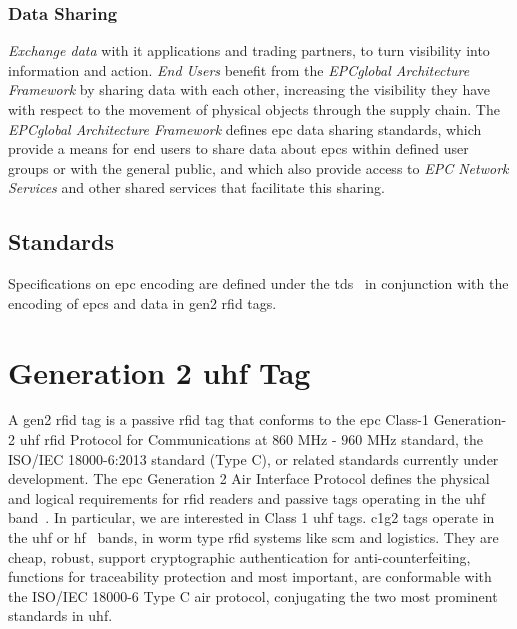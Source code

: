 \subsubsection{Data Sharing} 

\emph{Exchange data} with \ac{it} applications and trading partners, to turn visibility into information and action.
\emph{End Users} benefit from the \emph{EPCglobal Architecture Framework} by sharing data with each other, increasing the visibility they have with respect to the movement of physical objects through the supply chain. 
The \emph{EPCglobal Architecture Framework} defines \ac{epc} data sharing standards, which provide a means for end users to share data about \acp{epc} within defined user groups or with the general public, and which also provide access to \emph{EPC Network Services} and other shared services that facilitate this sharing.



\subsection{Standards}


Specifications on \ac{epc} encoding are defined under the \ac{tds}~\cite{GS1EPCTDS} in conjunction with the encoding of \acp{epc} and data in \ac{gen2} \ac{rfid} tags.

\section{Generation 2 \ac{uhf} Tag}

A \ac{gen2} \ac{rfid} tag is a passive \ac{rfid} tag that conforms to the \ac{epc} Class-1 Generation-2 \ac{uhf} \ac{rfid} Protocol for Communications at $860$ MHz - $960$ MHz standard, the ISO/IEC 18000-6:2013 standard (Type C), or related standards currently under development.
The \ac{epc} Generation 2 Air Interface Protocol defines the physical and logical requirements for \ac{rfid} readers and passive tags operating in the \ac{uhf} band~\cite{Gs1epcgen2v2uhfairinterfaceI2120180904}.
In particular, we are interested in Class 1 \ac{uhf} tags. \ac{c1g2} tags operate in the \ac{uhf} or \ac{hf}~\cite{EpcglobalHf3standard20110905r3} bands, in \ac{worm} type \ac{rfid} systems like \ac{scm} and logistics.
They are cheap, robust, support cryptographic authentication for anti-counterfeiting, functions for traceability protection and most important, are conformable with the ISO/IEC 18000-6 Type C air protocol, conjugating the two most prominent standards in \ac{uhf}.

